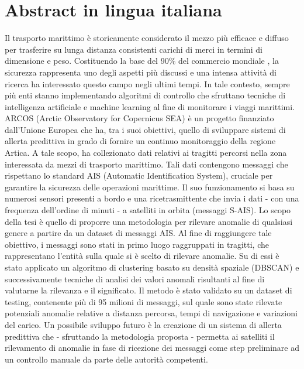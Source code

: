 \documentclass{Configuration_Files/PoliMi3i_thesis}
\begin{document}
\chapter*{Abstract in lingua italiana}

Il trasporto marittimo è storicamente considerato il mezzo più efficace e diffuso per trasferire su lunga distanza consistenti carichi di merci in termini di dimensione e peso. Costituendo la base del 90\% del commercio mondiale \cite{trasporto-marittimo}, la sicurezza rappresenta uno degli aspetti più discussi e una intensa attività di ricerca ha interessato questo campo negli ultimi tempi.  
In tale contesto, sempre più enti stanno implementando algoritmi di controllo che sfruttano tecniche di intelligenza artificiale e machine learning al fine di monitorare i viaggi marittimi. ARCOS (Arctic Observatory for Copernicus SEA) è un progetto finanziato dall'Unione Europea che ha, tra i suoi obiettivi, quello di sviluppare sistemi di allerta predittiva in grado di fornire un continuo monitoraggio della regione Artica. A tale scopo, ha collezionato dati relativi ai tragitti percorsi nella zona interessata da mezzi di trasporto marittimo. Tali dati contengono messaggi che rispettano lo standard AIS (Automatic Identification System), cruciale per garantire la sicurezza delle operazioni marittime. Il suo funzionamento si basa su numerosi sensori presenti a bordo e una ricetrasmittente che invia i dati - con una frequenza dell’ordine di minuti - a satelliti in orbita (messaggi S-AIS). Lo scopo della tesi è quello di proporre una metodologia per rilevare anomalie di qualsiasi genere a partire da un dataset di messaggi AIS. Al fine di raggiungere tale obiettivo, i messaggi sono stati in primo luogo raggruppati in tragitti, che rappresentano l'entità sulla quale si è scelto di rilevare anomalie. Su di essi è stato applicato un algoritmo di clustering basato su densità spaziale (DBSCAN) e successivamente tecniche di analisi dei valori anomali risultanti al fine di valutarne la rilevanza e il significato. Il metodo è stato validato su un dataset di testing, contenente più di 95 milioni di messaggi, sul quale sono state rilevate potenziali anomalie relative a distanza percorsa, tempi di navigazione e variazioni del carico. Un possibile sviluppo futuro è la creazione di un sistema di allerta predittiva che - sfruttando la metodologia proposta - permetta ai satelliti il rilevamento di anomalie in fase di ricezione dei messaggi come step preliminare ad un controllo manuale da parte delle autorità competenti.
\end{document}
